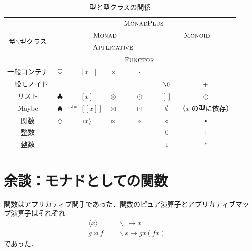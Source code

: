 \documentclass[a5paper,twoside,fleqn,draft]{jsbook}
\def\[{[\![}
\def\]{]\!]}
\newcommand{\mEmptyList}{{[\,]}}
\newcommand{\mNothing}{\emptyset}
\newcommand{\mZero}{\O}
\newcommand{\mAnonParam}{\diamond}
\DeclareMathOperator{\mAppend}{\oplus}
\DeclareMathOperator{\mAppMap}{\times}
\DeclareMathOperator{\mAppMapFunc}{\bowtie}
\DeclareMathOperator{\mAppMapList}{\otimes}
\DeclareMathOperator{\mAppMapMaybe}{\boxtimes}
\DeclareMathOperator{\mBind}{\heartsuit}
\DeclareMathOperator{\mBindFunc}{\diamondsuit}
\DeclareMathOperator{\mBindList}{\clubsuit}
\DeclareMathOperator{\mBindMaybe}{\spadesuit}
\DeclareMathOperator{\mComp}{\centerdot}
\DeclareMathOperator{\mLambda}{\backslash}
\DeclareMathOperator{\mLambdaArrow}{\mapsto}
\DeclareMathOperator{\mMap}{\cdot}
\DeclareMathOperator{\mMapFunc}{\circ}
\DeclareMathOperator{\mMapList}{\odot}
\DeclareMathOperator{\mMapMaybe}{\boxdot}
\DeclareMathOperator{\mPlus}{\boldmath{+}} %
\newcommand{\mValueConstructor}[1]{\mathrm{#1}}
\newcommand{\mValueWith}[2]{{}^\mValueConstructor{#1}\[#2\]}
\newcommand{\mJustWith}[1]{\mValueWith{Just}{#1}}
\newcommand{\mFuncWith}[1]{\langle#1\rangle}  %
\newcommand{\mPureWith}[1]{\[#1\]}
\newcommand{\mTypeClass}[1]{\textsc{#1}} %
\newcommand{\mApplicativeTypeClass}{\mTypeClass{Applicative}}
\newcommand{\mFunctorTypeClass}{\mTypeClass{Functor}}
\newcommand{\mMonadTypeClass}{\mTypeClass{Monad}}
\newcommand{\mMonadPlusTypeClass}{\mTypeClass{MonadPlus}}
\newcommand{\mMonoidTypeClass}{\mTypeClass{Monoid}}
\newcommand{\mLambdaEXP}[2]{\mLambda{#1}\mLambdaArrow{#2}} %
\begin{document}

\begin{table}
\label{tab:monadplus}
\caption{型と型クラスの関係}
\begin{center}
\begin{tabular}{||c||c|c|c|c|c|c||}
\hline
\multirow{4}{*}{型$\backslash$型クラス}
  &\multicolumn{6}{|c||}{$\mMonadPlusTypeClass$}\\
\cline{2-7}
\multirow{3}{*}{}
  &\multicolumn{4}{|c|}{$\mMonadTypeClass$}
  &\multicolumn{2}{|c||}{$\mMonoidTypeClass$}\\
\cline{3-5}
\multirow{2}{*}{}
  &
  &\multicolumn{3}{|c|}{$\mApplicativeTypeClass$}
  &\multicolumn{2}{|c||}{}\\
\cline{5-5}
\multirow{1}{*}{}
  &
  &\multicolumn{2}{|c|}{}
  &$\mFunctorTypeClass$
  &\multicolumn{2}{|c||}{}\\
\hline\hline
一般コンテナ
  &$\mBind$
  &$\mPureWith{x}$
  &$\mAppMap$
  &$\mMap$
  &
  &\\
\hline
一般モノイド
  &
  &
  &
  &
  &$\mZero$
  &$\mPlus$\\
\hline
リスト
  &$\mBindList$
  &$[x]$
  &$\mAppMapList$
  &$\mMapList$
  &$\mEmptyList$
  &$\mAppend$\\
\hline
Maybe
  &$\mBindMaybe$
  &$\mJustWith{x}$
  &$\mAppMapMaybe$
  &$\mMapMaybe$
  &$\mNothing$
  &（$x$ の型に依存）\\
\hline
関数
  &$\mBindFunc$
  &$\mFuncWith{x}$
  &$\mAppMapFunc$
  &$\mMapFunc$
  &$\mAnonParam$
  &$\mComp$\\
\hline
整数
  &
  &
  &
  &
  &$0$
  &$+$\\
\hline
整数
  &
  &
  &
  &
  &$1$
  &$*$\\
\hline
\end{tabular}
\end{center}
\end{table}

\section{余談：モナドとしての関数}

関数はアプリカティブ関手であった．関数のピュア演算子とアプリカティブマッ
プ演算子はそれぞれ
\begin{align}
\mFuncWith{x}&=\mLambdaEXP{\_}{x}\\
g\mAppMapFunc f&=\mLambdaEXP{x}{gx(fx)}
\end{align}
であった．
\end{document}
